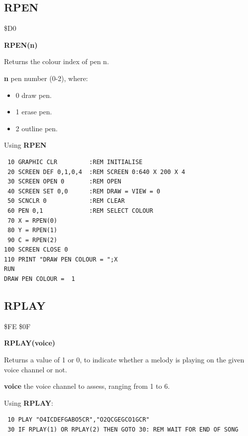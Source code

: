 \subsection{RPEN}
\begin{description}[leftmargin=2cm,style=nextline]
\item [Token:] \$D0
\item [Format:] {\bf RPEN(n)}
\item [Usage:]  Returns the colour index of pen n.

                {\bf n} pen number (0-2), where:

                \begin{itemize}
                    \item {0} draw pen.
                    \item {1} erase pen.
                    \item {2} outline pen.
                \end{itemize}

\item [Example:] Using {\bf RPEN}

\begin{tcolorbox}[colback=black,coltext=white]
\verbatimfont{\codefont}
\begin{verbatim}
 10 GRAPHIC CLR         :REM INITIALISE
 20 SCREEN DEF 0,1,0,4  :REM SCREEN 0:640 X 200 X 4
 30 SCREEN OPEN 0       :REM OPEN
 40 SCREEN SET 0,0      :REM DRAW = VIEW = 0
 50 SCNCLR 0            :REM CLEAR
 60 PEN 0,1             :REM SELECT COLOUR
 70 X = RPEN(0)
 80 Y = RPEN(1)
 90 C = RPEN(2)
100 SCREEN CLOSE 0
110 PRINT "DRAW PEN COLOUR = ";X
RUN
DRAW PEN COLOUR =  1
\end{verbatim}
\end{tcolorbox}
\end{description}


\newpage
\subsection{RPLAY}
\begin{description}[leftmargin=2cm,style=nextline]
\item [Token:] \$FE \$0F
\item [Format:] {\bf RPLAY(voice)}
\item [Usage:] Returns a value of 1 or 0, to indicate whether a melody is playing on the given voice channel or not.

               {\bf voice} the voice channel to assess, ranging from 1 to 6.

\item [Example:] Using {\bf RPLAY}:
\begin{tcolorbox}[colback=black,coltext=white]
\verbatimfont{\codefont}
\begin{verbatim}
 10 PLAY "O4ICDEFGABO5CR","O2QCGEGCO1GCR"
 30 IF RPLAY(1) OR RPLAY(2) THEN GOTO 30: REM WAIT FOR END OF SONG
\end{verbatim}
\end{tcolorbox}
\end{description}


